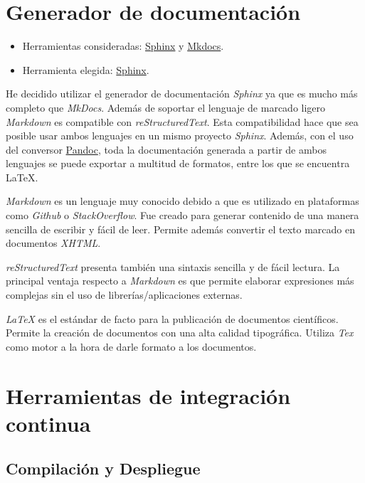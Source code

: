 \section{Generador de documentación}

\begin{itemize}
\tightlist
\item
  Herramientas consideradas:
  \href{https://www.sphinx-doc.org/es/master/index.html}{Sphinx} y
  \href{https://www.mkdocs.org/}{Mkdocs}.
\item
  Herramienta elegida:
  \href{https://www.sphinx-doc.org/es/master/index.html}{Sphinx}.
\end{itemize}

He decidido utilizar el generador de documentación \emph{Sphinx} ya que
es mucho más completo que \emph{MkDocs}. Además de soportar el lenguaje
de marcado ligero \emph{Markdown} es compatible con
\emph{reStructuredText}. Esta compatibilidad hace que sea posible usar
ambos lenguajes en un mismo proyecto \emph{Sphinx}. Además, con el uso
del conversor \href{http://pandoc.org/}{Pandoc}, toda la documentación
generada a partir de ambos lenguajes se puede exportar a multitud de
formatos, entre los que se encuentra LaTeX.

\emph{Markdown} es un lenguaje muy conocido debido a que es utilizado en
plataformas como \emph{Github} o \emph{StackOverflow}. Fue creado para
generar contenido de una manera sencilla de escribir y fácil de leer.
Permite además convertir el texto marcado en documentos \emph{XHTML}.

\emph{reStructuredText} presenta también una sintaxis sencilla y de
fácil lectura. La principal ventaja respecto a \emph{Markdown} es que
permite elaborar expresiones más complejas sin el uso de
librerías/aplicaciones externas.

\emph{LaTeX} es el estándar de facto para la publicación de documentos
científicos. Permite la creación de documentos con una alta calidad
tipográfica. Utiliza \emph{Tex} como motor a la hora de darle formato a
los documentos.

\section{Herramientas de integración continua}

\subsection{Compilación y Despliegue}

